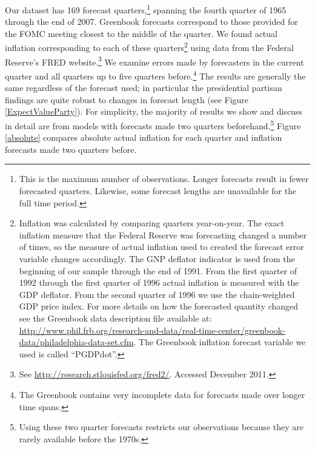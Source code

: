 \documentclass[a4paper]{article}\usepackage{graphicx, color}
\begin{document}
Our dataset has 169 forecast quarters,\footnote{This is the maximum number of observations. Longer forecasts result in fewer forecasted quarters. Likewise, some forecast lengths are unavailable for the full time period.} spanning the fourth quarter of 1965 through the end of 2007. Greenbook forecasts correspond to those provided for the FOMC meeting closest to the middle of the quarter. We found actual inflation corresponding to each of these quarters\footnote{Inflation was calculated by comparing quarters year-on-year. The exact inflation measure that the Federal Reserve was forecasting changed a number of times, so the measure of actual inflation used to created the forecast error variable changes accordingly. The GNP deflator indicator is used from the beginning of our sample through the end of 1991. From the first quarter of 1992 through the first quarter of 1996 actual inflation is measured with the GDP deflator. From the second quarter of 1996 we use the chain-weighted GDP price index. For more details on how the forecasted quantity changed see the Greenbook data description file available at: \url{http://www.phil.frb.org/research-and-data/real-time-center/greenbook-data/philadelphia-data-set.cfm}. The Greenbook inflation forecast variable we used is called ``PGDPdot''.} using data from the Federal Reserve's FRED website.\footnote{See \url{http://research.stlouisfed.org/fred2/}. Accessed December 2011.} We examine errors made by forecasters in the current quarter and all quarters up to five quarters before.\footnote{The Greenbook contains very incomplete data for forecasts made over longer time spans.} The results are generally the same regardless of the forecast used; in particular the presidential partisan findings are quite robust to changes in forecast length (see Figure \ref{ExpectValueParty}). For simplicity, the majority of results we show and discuss in detail are from models with forecasts made two quarters beforehand.\footnote{Using these two quarter forecasts restricts our observations because they are rarely available before the 1970s.} Figure \ref{absolute} compares absolute actual inflation for each quarter and inflation forecasts made two quarters before.
\end{document}
